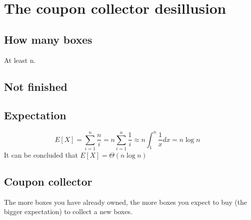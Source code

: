 \documentclass[12pt,a4paper]{article}
\theoremstyle{definition}
\begin{document}
\section{The coupon collector desillusion}
\subsection{How many boxes}
At least n.
\subsection{Not finished}
\subsection{Expectation}
$$
E[X]=\sum_{i=1}^{n} \frac{n}{i}=n \sum_{i=1}^{n} \frac{1}{i} \approx n \int_{1}^{n} \frac{1}{x} d x=n \log n
$$
It can be concluded that $E[X]=\Theta(n\log n)$
\subsection{Coupon collector}
The more boxes you have already owned, the more boxes you expect to buy (the bigger expectation) to collect a new boxes.
\end{document}
